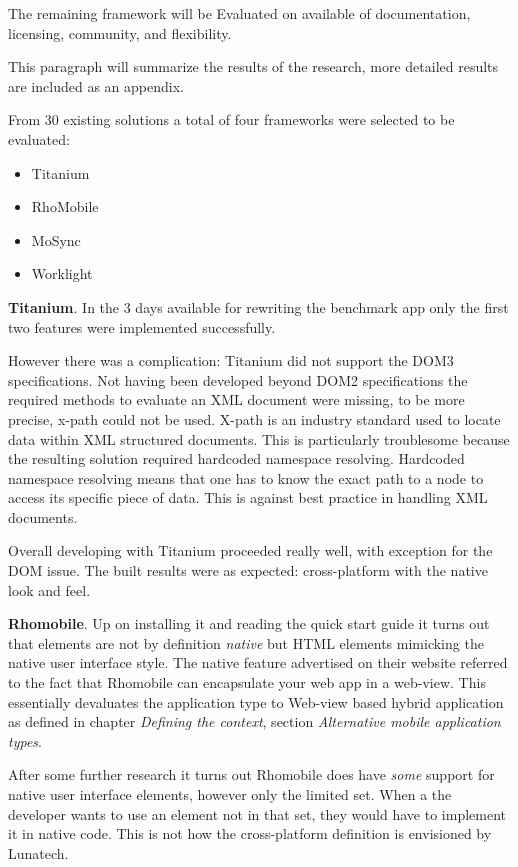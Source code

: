The remaining framework will be Evaluated on available of documentation, licensing, community, and flexibility.

This paragraph will summarize the results of the research, more detailed results are included as an appendix. %

From 30 existing solutions a total of four frameworks were selected to be evaluated:
\begin{itemize}
	\item Titanium
	\item RhoMobile
	\item MoSync
	\item Worklight
\end{itemize}

{\bf Titanium}. In the 3 days available for rewriting the benchmark app only the first two features were implemented successfully.

However there was a complication: Titanium did not support the DOM3 specifications. Not having been developed beyond DOM2 specifications the required methods to evaluate an XML document were missing, to be more precise, x-path could not be used. X-path is an industry standard used to locate data within XML structured documents. This is particularly troublesome because the resulting solution required hardcoded namespace resolving. Hardcoded namespace resolving means that one has to know the exact path to a node to access its specific piece of data. This is against best practice in handling XML documents. %

Overall developing with Titanium proceeded really well, with exception for the DOM issue. The built results were as expected: cross-platform with the native look and feel.

{\bf Rhomobile}. Up on installing it and reading the quick start guide it turns out that elements are not by definition \emph{native} but HTML elements mimicking the native user interface style. The native feature advertised on their website referred to the fact that Rhomobile can encapsulate your web app in a web-view. This essentially devaluates the application type to Web-view based hybrid application as defined in chapter \emph{Defining the context}, section \emph{Alternative mobile application types}.

After some further research it turns out Rhomobile does have \emph{some} support for native user interface elements, however only the limited set. When a the developer wants to use an element not in that set, they would have to implement it in native code.\cite{Rhomobile2012} This is not how the cross-platform definition is envisioned by Lunatech.

